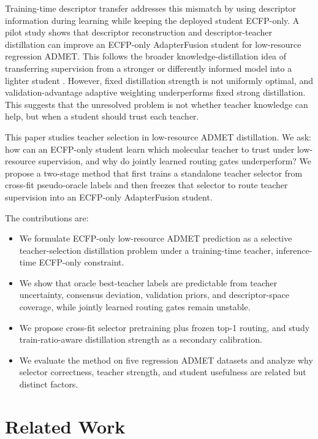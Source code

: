\documentclass[11pt]{article}
\begin{document}
Training-time descriptor transfer addresses this mismatch by using descriptor
information during learning while keeping the deployed student ECFP-only. A
pilot study shows that descriptor reconstruction and descriptor-teacher
distillation can improve an ECFP-only AdapterFusion student for low-resource
regression ADMET. This follows the broader knowledge-distillation idea of
transferring supervision from a stronger or differently informed model into a
lighter student \cite{Hinton2015}. However, fixed distillation strength is not uniformly
optimal, and validation-advantage adaptive weighting underperforms fixed
strong distillation. This suggests that the unresolved problem is not whether
teacher knowledge can help, but when a student should trust each teacher.

This paper studies teacher selection in low-resource ADMET distillation. We
ask: how can an ECFP-only student learn which molecular teacher to trust under
low-resource supervision, and why do jointly learned routing gates
underperform? We propose a two-stage method that first trains a standalone
teacher selector from cross-fit pseudo-oracle labels and then freezes that
selector to route teacher supervision into an ECFP-only AdapterFusion student.

The contributions are:
\begin{itemize}
  \item We formulate ECFP-only low-resource ADMET prediction as a selective
  teacher-selection distillation problem under a training-time teacher,
  inference-time ECFP-only constraint.
  \item We show that oracle best-teacher labels are predictable from teacher
  uncertainty, consensus deviation, validation priors, and descriptor-space
  coverage, while jointly learned routing gates remain unstable.
  \item We propose cross-fit selector pretraining plus frozen top-1 routing,
  and study train-ratio-aware distillation strength as a secondary
  calibration.
  \item We evaluate the method on five regression ADMET datasets and analyze
  why selector correctness, teacher strength, and student usefulness are
  related but distinct factors.
\end{itemize}

\section{Related Work}
\end{document}
